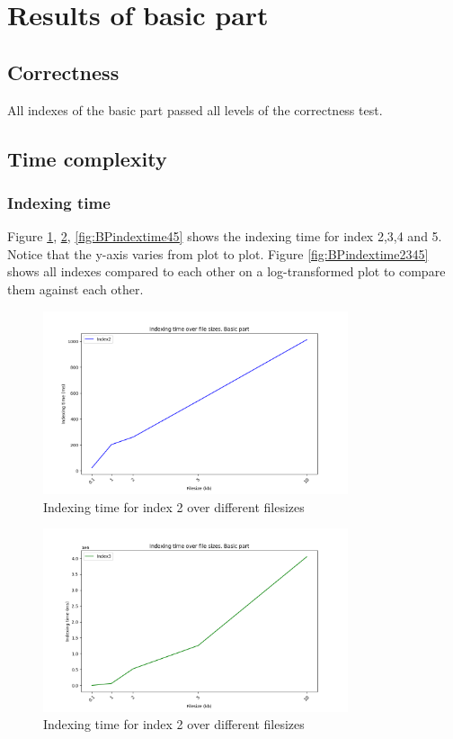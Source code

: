 \section{Results of basic part}
\subsection{Correctness}
All indexes  of the basic part passed all levels of the correctness test.

\subsection{Time complexity}
\subsubsection{Indexing time}
Figure \ref{fig:BPindextime2}, \ref{fig:BPindextime3}, \ref{fig:BPindextime45} shows the indexing time for index 2,3,4 and 5. Notice that the y-axis varies from plot to plot. Figure \ref{fig:BPindextime2345} shows all indexes compared to each other on a log-transformed plot to compare them against each other.


\begin{figure}[H]
    \centering
     \includegraphics[width=0.8\textwidth]{LaTeX/Figures/BasicPart/BPIndexing[2].png}
    \caption{Indexing time for index 2 over different filesizes}
    \label{fig:BPindextime2}
\end{figure}

\begin{figure}[H]
    \centering
    \includegraphics[width=0.8\textwidth]{LaTeX/Figures/BasicPart/BPIndexing[3].png}
    \caption{Indexing time for index 2 over different filesizes}
    \label{fig:BPindextime3}
\end{figure}

